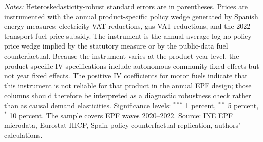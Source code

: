 \begin{table}[H]
\begin{minipage}{0.96\linewidth}
\footnotesize
\emph{Notes:} Heteroskedasticity-robust standard errors are in parentheses.
Prices are instrumented with the annual product-specific policy wedge generated
by Spanish energy measures: electricity VAT reductions, gas VAT reductions, and
the 2022 transport-fuel price subsidy. The instrument is the annual average
log no-policy price wedge implied by the statutory measure or by the
public-data fuel counterfactual. Because the instrument varies at the
product-year level, the product-specific IV specifications include autonomous
community fixed effects but not year fixed effects. The positive IV coefficients
for motor fuels indicate that this instrument is not reliable for that product
in the annual EPF design; those columns should therefore be interpreted as a
diagnostic robustness check rather than as causal demand elasticities.
Significance levels: $^{***}$ 1 percent, $^{**}$ 5 percent, $^{*}$ 10 percent.
The sample covers EPF waves 2020--2022. Source: INE EPF microdata, Eurostat
HICP, Spain policy counterfactual replication, authors' calculations.
\end{minipage}
\end{table}
